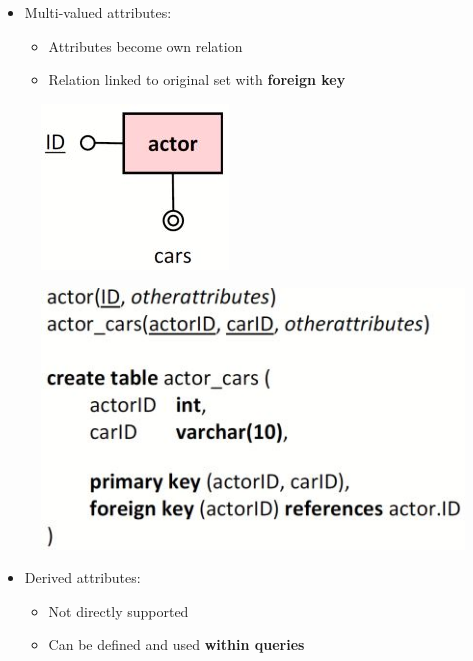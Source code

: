 \documentclass[conference]{IEEEtran}
\begin{document}
\begin{itemize}
    \item Multi-valued attributes:
    \begin{itemize}
        \item Attributes become own relation
        \item Relation linked to original set with \textbf{foreign key}
    \end{itemize}
\end{itemize}
\begin{figure} [h!]
    \centering
    \includegraphics[scale=0.5]{Ex22.JPG}
\end{figure}
\begin{figure} [h!]
    \centering
    \includegraphics[scale=0.5]{Ex23.JPG}
\end{figure}

\begin{itemize}
    \item Derived attributes:
    \begin{itemize}
        \item Not directly supported
        \item Can be defined and used \textbf{within queries}
    \end{itemize}
\end{itemize}

\pagebreak
\end{document}
